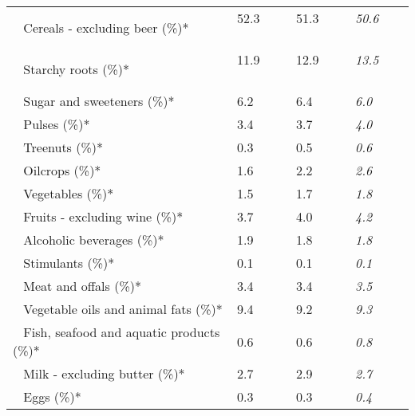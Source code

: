 \begin{tabular}{L{3.9cm} R{1cm} R{1cm} R{1cm}}
	 ~ Cereals - excluding beer (\%)* & 52.3 ~ \ \ & 51.3 ~ \ \ & \textit{50.6} ~ \ \ \\ 
	 ~ Starchy roots (\%)* & 11.9 ~ \ \ & 12.9 ~ \ \ & \textit{13.5} ~ \ \ \\ 
	 ~ Sugar and sweeteners (\%)* & 6.2 ~ \ \ & 6.4 ~ \ \ & \textit{6.0} ~ \ \ \\ 
	 ~ Pulses (\%)* & 3.4 ~ \ \ & 3.7 ~ \ \ & \textit{4.0} ~ \ \ \\ 
	 ~ Treenuts (\%)* & 0.3 ~ \ \ & 0.5 ~ \ \ & \textit{0.6} ~ \ \ \\ 
	 ~ Oilcrops (\%)* & 1.6 ~ \ \ & 2.2 ~ \ \ & \textit{2.6} ~ \ \ \\ 
	 ~ Vegetables (\%)* & 1.5 ~ \ \ & 1.7 ~ \ \ & \textit{1.8} ~ \ \ \\ 
	 ~ Fruits - excluding wine (\%)* & 3.7 ~ \ \ & 4.0 ~ \ \ & \textit{4.2} ~ \ \ \\ 
	 ~ Alcoholic beverages (\%)* & 1.9 ~ \ \ & 1.8 ~ \ \ & \textit{1.8} ~ \ \ \\ 
	 ~ Stimulants (\%)* & 0.1 ~ \ \ & 0.1 ~ \ \ & \textit{0.1} ~ \ \ \\ 
	 ~ Meat and offals (\%)* & 3.4 ~ \ \ & 3.4 ~ \ \ & \textit{3.5} ~ \ \ \\ 
	 ~ Vegetable oils and animal fats (\%)* & 9.4 ~ \ \ & 9.2 ~ \ \ & \textit{9.3} ~ \ \ \\ 
	 ~ Fish, seafood and aquatic products (\%)* & 0.6 ~ \ \ & 0.6 ~ \ \ & \textit{0.8} ~ \ \ \\ 
	 ~ Milk - excluding butter (\%)* & 2.7 ~ \ \ & 2.9 ~ \ \ & \textit{2.7} ~ \ \ \\ 
	 ~ Eggs (\%)* & 0.3 ~ \ \ & 0.3 ~ \ \ & \textit{0.4} ~ \ \ \\ 
       \toprule
      \end{tabular}
      \clearpage
